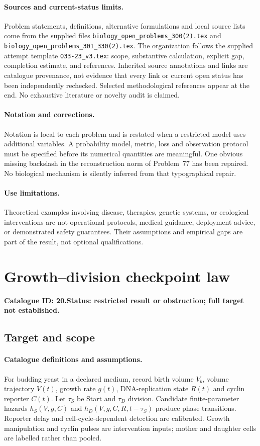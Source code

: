 \documentclass[11pt]{article}
\begin{document}
\paragraph{Sources and current-status limits.}
Problem statements, definitions, alternative formulations and local source lists
come from the supplied files
\texttt{biology\_open\_problems\_300(2).tex} and
\texttt{biology\_open\_problems\_301\_330(2).tex}.
The organization follows the supplied attempt template
\texttt{O33-23\_v3.tex}: scope, substantive calculation, explicit gap,
completion estimate, and references. Inherited source annotations and links are
catalogue provenance, not evidence that every link or current open status has
been independently rechecked. Selected methodological references appear at the
end. No exhaustive literature or novelty audit is claimed.

\paragraph{Notation and corrections.}
Notation is local to each problem and is restated when a restricted model uses
additional variables. A probability model, metric, loss and observation protocol
must be specified before its numerical quantities are meaningful. One obvious
missing backslash in the reconstruction norm of Problem~77 has been repaired.
No biological mechanism is silently inferred from that typographical repair.

\paragraph{Use limitations.}
Theoretical examples involving disease, therapies, genetic systems, or ecological
interventions are not operational protocols, medical guidance, deployment advice,
or demonstrated safety guarantees. Their assumptions and empirical gaps are part
of the result, not optional qualifications.

\setcounter{section}{19}
\section{Growth--division checkpoint law}
\label{prob:020}
\noindent\textbf{Catalogue ID: 20.}\quad \textbf{Status: restricted result or obstruction; full target not established.}
\subsection{Target and scope}
\paragraph{Catalogue definitions and assumptions.}
For budding yeast in a declared medium, record birth volume $V_b$, volume trajectory $V(t)$, growth rate $g(t)$, DNA-replication state $R(t)$ and cyclin reporter $C(t)$. Let $\tau_S$ be Start and $\tau_D$ division. Candidate finite-parameter hazards $h_S(V,g,C)$ and $h_D(V,g,C,R,t-\tau_S)$ produce phase transitions. Reporter delay and cell-cycle-dependent detection are calibrated. Growth manipulation and cyclin pulses are intervention inputs; mother and daughter cells are labelled rather than pooled.
\end{document}
